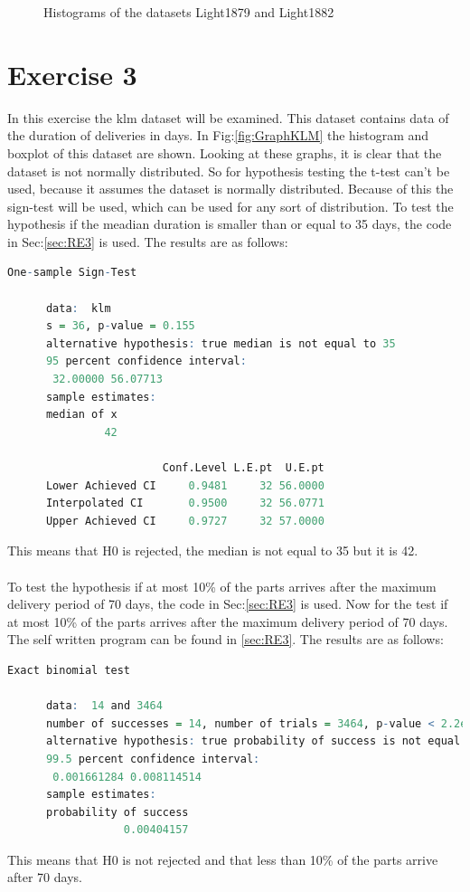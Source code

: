 \documentclass{article}
\begin{document}
\begin{figure}
      \caption{Histograms of the datasets Light1879 and Light1882}
      \label{fig:HistEx2}
    \end{figure}

  \section{Exercise 3}
    In this exercise the klm dataset will be examined.
    This dataset contains data of the duration of deliveries in days.
    In Fig:\ref{fig:GraphKLM} the histogram and boxplot of this dataset are shown.
    Looking at these graphs, it is clear that the dataset is not normally distributed.
    So for hypothesis testing the t-test can't be used, because it assumes the dataset is normally distributed.
    Because of this the sign-test will be used, which can be used for any sort of distribution.
    To test the hypothesis if the meadian duration is smaller than or equal to 35 days,
    the code in Sec:\ref{sec:RE3} is used.
    The results are as follows:\\
    \begin{lstlisting}[language=R]
        One-sample Sign-Test

      data:  klm
      s = 36, p-value = 0.155
      alternative hypothesis: true median is not equal to 35
      95 percent confidence interval:
       32.00000 56.07713
      sample estimates:
      median of x 
               42 

                        Conf.Level L.E.pt  U.E.pt
      Lower Achieved CI     0.9481     32 56.0000
      Interpolated CI       0.9500     32 56.0771
      Upper Achieved CI     0.9727     32 57.0000
    \end{lstlisting}
    This means that H0 is rejected, the median is not equal to 35 but it is 42.\\\\
    To test the hypothesis if at most 10\% of the parts arrives after the maximum delivery period of 70 days,
    the code in Sec:\ref{sec:RE3} is used.
    Now for the test if at most 10\% of the parts arrives after the maximum delivery period of 70 days.
    The self written program can be found in \ref{sec:RE3}.
    The results are as follows:\\
    \begin{lstlisting}[language=R]
        Exact binomial test

      data:  14 and 3464
      number of successes = 14, number of trials = 3464, p-value < 2.2e-16
      alternative hypothesis: true probability of success is not equal to 0.5
      99.5 percent confidence interval:
       0.001661284 0.008114514
      sample estimates:
      probability of success 
                  0.00404157 
    \end{lstlisting}
    This means that H0 is not rejected and that less than 10\% of the parts arrive after 70 days.
\end{document}
